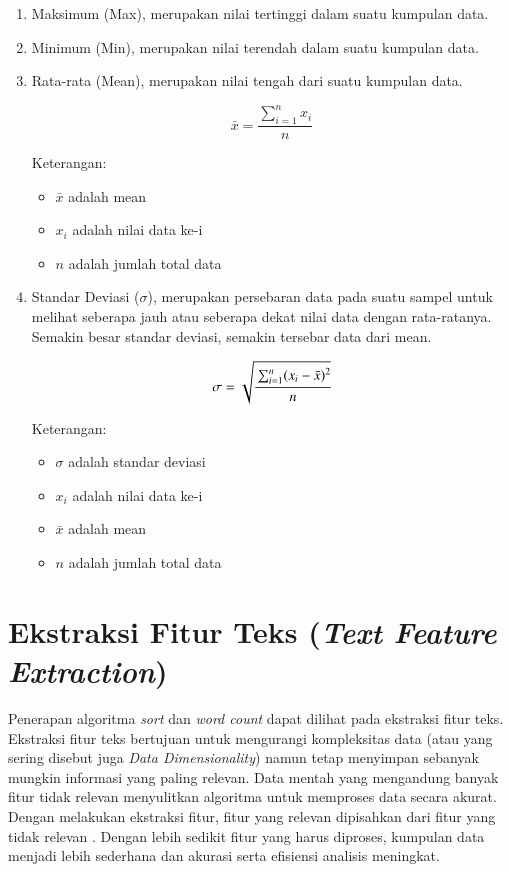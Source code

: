 \begin{enumerate}
\item Maksimum (Max), merupakan nilai tertinggi dalam suatu kumpulan data. 

\item Minimum (Min), merupakan nilai terendah dalam suatu kumpulan data. 

\item Rata-rata (Mean), merupakan nilai tengah dari suatu kumpulan data. 

\begin{equation}
\bar{x} = \dfrac{\sum_{i=1}^{n} x_i}{n}
\end{equation}

Keterangan:
\begin{itemize}
\item $\bar{x}$ adalah mean
\item $x_i$ adalah nilai data ke-i
\item $n$ adalah jumlah total data
\end{itemize}

\newpage
\item Standar Deviasi ($\sigma$), merupakan persebaran data pada suatu sampel untuk melihat seberapa jauh atau seberapa dekat nilai data dengan rata-ratanya. Semakin besar standar deviasi, semakin tersebar data dari mean. 

\begin{equation}
\text{$\sigma$} = \sqrt{\cfrac{\sum_{i=1}^{n} (x_i - \bar{x})^2}{n}}
\end{equation}

Keterangan:
\begin{itemize}
\item $\sigma$ adalah standar deviasi
\item $x_i$ adalah nilai data ke-i
\item $\bar{x}$ adalah mean
\item $n$ adalah jumlah total data
\end{itemize}

\end{enumerate}

\section{Ekstraksi Fitur Teks (\textit{Text Feature Extraction})}
Penerapan algoritma \textit{sort} dan \textit{word count} dapat dilihat pada ekstraksi fitur teks. Ekstraksi fitur teks bertujuan untuk mengurangi kompleksitas data (atau yang sering disebut juga \textit{Data Dimensionality}) namun tetap menyimpan sebanyak mungkin informasi yang paling relevan. Data mentah yang mengandung banyak fitur tidak relevan menyulitkan algoritma untuk memproses data secara akurat. Dengan melakukan ekstraksi fitur, fitur yang relevan dipisahkan dari fitur yang tidak relevan \cite{shakerFeatureExtractionBased2022}. Dengan lebih sedikit fitur yang harus diproses, kumpulan data menjadi lebih sederhana dan akurasi serta efisiensi analisis meningkat.

